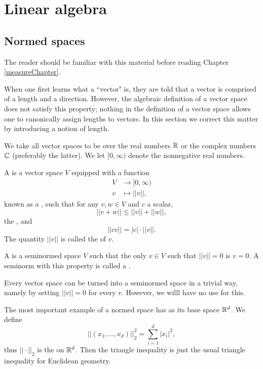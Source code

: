 \appendix
\chapter{Linear algebra}
\section{Normed spaces}
The reader should be familiar with this material before reading Chapter \ref{measureChapter}.

When one first learns what a ``vector" is, they are told that a vector is comprised of a length and a direction.
However, the algebraic definition of a vector space does not satisfy this property; nothing in the definition of a vector space allows one to canonically assign lengths to vectors.
In this section we correct this matter by introducing a notion of length.

We take all vector spaces to be over the real numbers $\mathbb{R}$ or the complex numbers $\mathbb{C}$ (preferably the latter).
We let $[0, \infty)$ denote the nonnegative real numbers.

\begin{definition}
A  is a vector space $V$ equipped with a function
\begin{align*}V &\to [0, \infty)\\
v &\mapsto ||v||,\end{align*}
known as a , such that for any $v, w \in V$ and $c$ a scalar,
$$||v + w|| \leq ||v|| + ||w||,$$
the , and
$$||cv|| = |c|\cdot||v||.$$
The quantity $||v||$ is called the  of $v$.

A  is a seminormed space $V$ such that the only $v \in V$ such that $||v|| = 0$ is $v = 0$.
A seminorm with this property is called a .
\end{definition}

Every vector space can be turned into a seminormed space in a trivial way, namely by setting $||v|| = 0$ for every $v$.
However, we willl have no use for this.

\begin{example}
The most important example of a normed space has as its base space $\mathbb{R}^d$.
We define
$$||(x_1, \dots, x_d)||_2^2 = \sum_{i=1}^d |x_i|^2,$$
thus $||\cdot||_2$ is the  on $\mathbb{R}^d$.
Then the triangle inequality is just the usual triangle inequality for Euclidean geometry.
\end{example}

